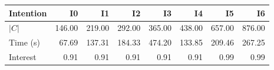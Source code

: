 \begin{tabular}{lrrrrrrr}
\toprule
Intention & I0 & I1 & I2 & I3 & I4 & I5 & I6 \\
\midrule
$|C|$ & 146.00 & 219.00 & 292.00 & 365.00 & 438.00 & 657.00 & 876.00 \\
Time (s) & 67.69 & 137.31 & 184.33 & 474.20 & 133.85 & 209.46 & 267.25 \\
Interest & 0.91 & 0.91 & 0.91 & 0.91 & 0.91 & 0.99 & 0.99 \\
\bottomrule
\end{tabular}
